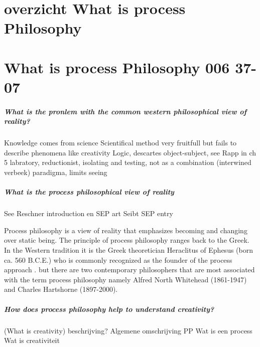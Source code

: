 \documentclass[a4paper]{Thesis}
\begin{document}
	


\chapter{overzicht What is process Philosophy}




\chapter{What is process Philosophy 006 37-07}

\paragraph{What is the pronlem with the common western philosophical view of reality?}
Knowledge comes from science
Scientifical method very fruitfull but fails to describe phenomena like creativity
Logic, descartes object-subject, see Rapp in ch 5
labratory, reductionist, isolating and testing, not as a combination (interwined verbeek)
paradigma, limits seeing

\paragraph{What is the process philosophical view of reality}
See Reschner introduction en SEP art \cite{Rescher-2012-sep}
Seibt SEP entry \cite{Seibt-2013-sep}


Process philosophy is a view of reality that emphasizes becoming and changing over static being. The principle of process philosophy ranges back to the Greek.
In the Western tradition it is the Greek theoretician Heraclitus of Ephesus (born ca. 560 B.C.E.) who is commonly recognized as the founder of the process approach \cite{Seibt-2013-sep}. 
but there are two contemporary philosophers that are most associated with the term process philosophy namely Alfred North Whitehead (1861-1947) and Charles Hartshorne (1897-2000).



\paragraph{How does process philosophy help to understand creativity?}

\paragragph(What is creativity)
beschrijving?
Algemene omschrijving PP
Wat is een process
Wat is creativiteit
\end{document}
